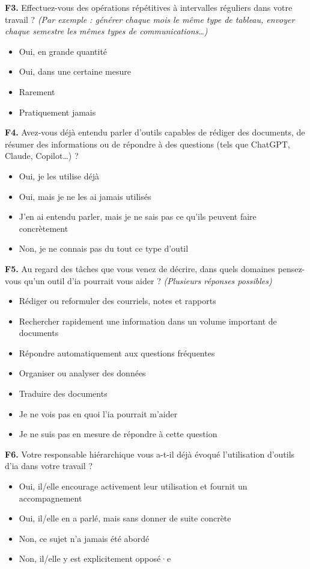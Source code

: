 \textbf{F3.} Effectuez-vous des opérations répétitives à intervalles
réguliers dans votre travail ? \textit{(Par exemple : générer chaque mois
le même type de tableau, envoyer chaque semestre les mêmes types de
communications\ldots)}
\begin{itemize}[label=$\square$, leftmargin=1.5cm]
  \item Oui, en grande quantité
  \item Oui, dans une certaine mesure
  \item Rarement
  \item Pratiquement jamais
\end{itemize}
 
\textbf{F4.} Avez-vous déjà entendu parler d'outils capables de rédiger
des documents, de résumer des informations ou de répondre à des questions
(tels que ChatGPT, Claude, Copilot\ldots) ?
\begin{itemize}[label=$\square$, leftmargin=1.5cm]
  \item Oui, je les utilise déjà
  \item Oui, mais je ne les ai jamais utilisés
  \item J'en ai entendu parler, mais je ne sais pas ce qu'ils peuvent
        faire concrètement
  \item Non, je ne connais pas du tout ce type d'outil
\end{itemize}
 
\textbf{F5.} Au regard des tâches que vous venez de décrire, dans quels
domaines pensez-vous qu'un outil d'\gls{ia} pourrait vous aider ?
\textit{(Plusieurs réponses possibles)}
\begin{itemize}[label=$\square$, leftmargin=1.5cm]
  \item Rédiger ou reformuler des courriels, notes et rapports
  \item Rechercher rapidement une information dans un volume important de
        documents
  \item Répondre automatiquement aux questions fréquentes
  \item Organiser ou analyser des données
  \item Traduire des documents
  \item Je ne vois pas en quoi l'\gls{ia} pourrait m'aider
  \item Je ne suis pas en mesure de répondre à cette question
\end{itemize}
 
\textbf{F6.} Votre responsable hiérarchique vous a-t-il déjà évoqué
l'utilisation d'outils d'\gls{ia} dans votre travail ?
\begin{itemize}[label=$\square$, leftmargin=1.5cm]
  \item Oui, il/elle encourage activement leur utilisation et fournit un
        accompagnement
  \item Oui, il/elle en a parlé, mais sans donner de suite concrète
  \item Non, ce sujet n'a jamais été abordé
  \item Non, il/elle y est explicitement opposé·e
\end{itemize}
 
